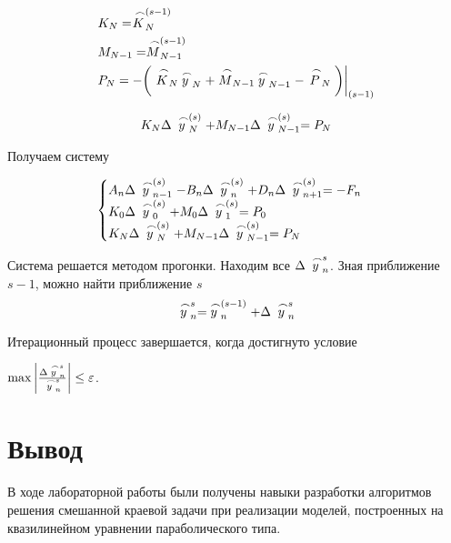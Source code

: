 \documentclass[a4paper, 14pt]{article}
\begin{document}
\begin{equation*}
\begin{aligned}
&K_N=\buildrel\,\,\frown\over{K}_N^{(s-1)}\\
&M_{N-1}=\buildrel\,\,\frown\over{M}_{N-1}^{(s-1)}\\
&P_N=-\bigg( \buildrel\,\,\frown\over{K}_N \buildrel\,\,\frown\over{y}_N+ \buildrel\,\,\frown\over{M}_{N-1} \buildrel\,\,\frown\over{y}_{N-1}- \buildrel\,\,\frown\over{P}_N\bigg)\bigg|_{(s-1)}\\
\end{aligned}
\end{equation*}

\begin{equation*}
\begin{aligned}
&K_N\Delta\buildrel\,\,\frown\over{y}_{N}^{(s)}+M_{N-1}\Delta\buildrel\,\,\frown\over{y}_{N-1}^{(s)}=P_N\\
\end{aligned}
\end{equation*}

Получаем систему

\begin{equation}
\begin{cases}
A_n\Delta\buildrel\,\,\frown\over{y}_{n-1}^{(s)}-B_n\Delta\buildrel\,\,\frown\over{y}_{n}^{(s)}+D_n\Delta\buildrel\,\,\frown\over{y}_{n+1}^{(s)}=-F_n\\
K_0\Delta\buildrel\,\,\frown\over{y}_{0}^{(s)}+M_0\Delta\buildrel\,\,\frown\over{y}_{1}^{(s)}=P_0\\
K_N\Delta\buildrel\,\,\frown\over{y}_{N}^{(s)}+M_{N-1}\Delta\buildrel\,\,\frown\over{y}_{N-1}^{(s)}=P_N\\
\end{cases}
\end{equation}

Система решается методом прогонки. Находим все $\Delta \buildrel\,\,\frown\over y_n^s$.
Зная приближение $s-1$, можно найти приближение $s$
$$ \buildrel\,\,\frown\over y_n^s=  \buildrel\,\,\frown\over y_n^{(s-1)}+\Delta \buildrel\,\,\frown\over y_n^s $$

Итерационный процесс завершается, когда достигнуто условие

$\max\bigg|\frac{\Delta \buildrel\,\,\frown\over y_n^s}{\buildrel\,\,\frown\over y_n^s}\bigg|\le\varepsilon$. 

\section*{Вывод}

В ходе лабораторной работы были получены навыки разработки алгоритмов решения смешанной краевой задачи при реализации моделей, построенных на квазилинейном уравнении параболического типа.
\end{document}
